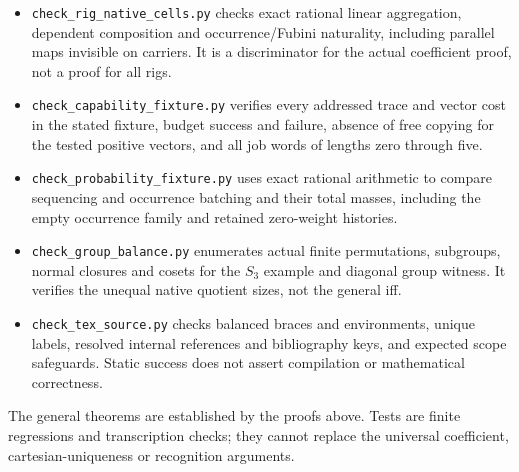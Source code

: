 \documentclass[11pt,a4paper]{article}
\theoremstyle{definition}
\begin{document}
\begin{itemize}
\item \texttt{check\_rig\_native\_cells.py} checks exact rational linear
aggregation, dependent composition and occurrence/Fubini naturality, including
parallel maps invisible on carriers. It is a discriminator for the actual
coefficient proof, not a proof for all rigs.
\item \texttt{check\_capability\_fixture.py} verifies every addressed trace
and vector cost in the stated fixture, budget success and failure, absence of
free copying for the tested positive vectors, and all job words of lengths
zero through five.
\item \texttt{check\_probability\_fixture.py} uses exact rational arithmetic
to compare sequencing and occurrence batching and their total masses, including
the empty occurrence family and retained zero-weight histories.
\item \texttt{check\_group\_balance.py} enumerates actual finite permutations,
subgroups, normal closures and cosets for the $S_3$ example and diagonal group
witness. It verifies the unequal native quotient sizes, not the general iff.
\item \texttt{check\_tex\_source.py} checks balanced braces and environments,
unique labels, resolved internal references and bibliography keys, and expected
scope safeguards. Static success does not assert compilation or mathematical
correctness.
\end{itemize}
The general theorems are established by the proofs above. Tests are finite
regressions and transcription checks; they cannot replace the universal
coefficient, cartesian-uniqueness or recognition arguments.
\end{document}
